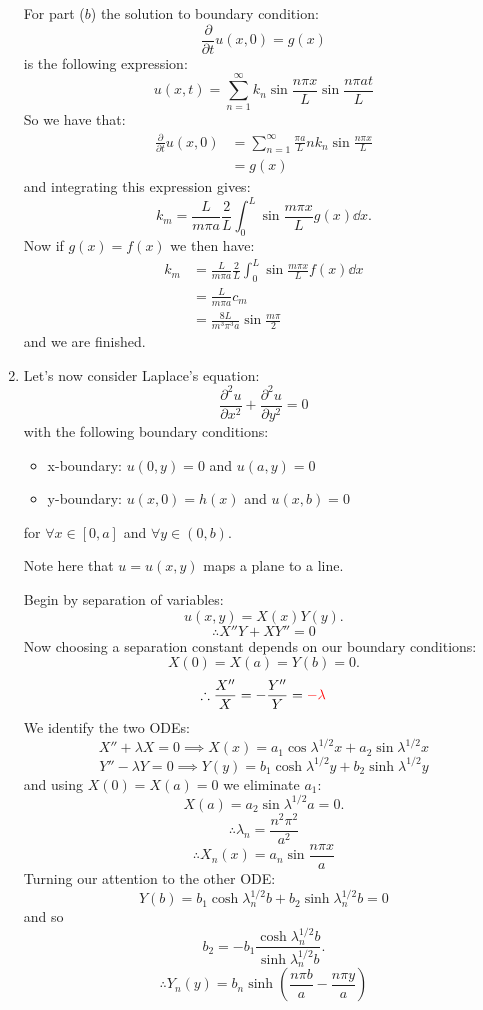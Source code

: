 \begin{enumerate}
    \newpage

    For part ($b$) the solution to boundary condition:
    $$\frac{\partial}{\partial t}u(x,0)=g(x)$$
    is the following expression:
    $$u(x,t)=\sum_{n=1}^{\infty}k_n
    \sin\frac{n\pi x}{L}\sin\frac{n\pi at}{L}$$
    So we have that:
    \begin{align*}
        \frac{\partial}{\partial t}u(x,0)
        &=\sum_{n=1}^{\infty}\frac{\pi a}{L}
        nk_n
        \sin\frac{n\pi x}{L} \\
        &=g(x)
    \end{align*}
    and integrating this expression gives:
    $$k_m=\frac{L}{m\pi a}
    \frac{2}{L}\int_{0}^{L}
    \sin\frac{m\pi x}{L}g(x)\dd x.$$
    Now if $g(x)=f(x)$ we then have:
    \begin{align*}
        k_m
        &=\frac{L}{m\pi a}
        \frac{2}{L}\int_{0}^{L}
        \sin\frac{m\pi x}{L}f(x)\dd x \\
        &=\frac{L}{m\pi a}c_m \\
        &=\frac{8L}{m^3\pi^3 a}\sin\frac{m\pi}{2}
    \end{align*}
    and we are finished.

    \newpage

    \item Let's now consider Laplace's equation:
    $$\frac{\partial^2 u}{\partial x^2}+\frac{\partial^2 u}{\partial y^2}=0$$
    with the following boundary conditions:
    \begin{itemize}
        \item x-boundary: $u(0,y)=0$ and $u(a,y)=0$
        \item y-boundary: $u(x,0)=h(x)$ and $u(x,b)=0$
    \end{itemize}
    for $\forall x\in[0,a]$ and $\forall y\in(0,b)$.

    Note here that $u=u(x,y)$ maps a plane to a line.

    Begin by separation of variables:
    $$u(x,y)=X(x)Y(y).$$
    $$\therefore X''Y+XY''=0$$
    Now choosing a separation constant depends on our boundary conditions:
    $$X(0)=X(a)=Y(b)=0.$$
    $$\therefore\frac{X''}{X}=-\frac{Y''}{Y}=\textcolor{red}{-\lambda}$$
    We identify the two ODEs:
    $$X''+\lambda X=0\implies
    X(x)=a_1\cos\lambda^{1/2} x+a_2\sin\lambda^{1/2} x$$
    $$Y''-\lambda Y=0\implies
    Y(y)=b_1\cosh\lambda^{1/2}y+b_2\sinh\lambda^{1/2}y$$
    and using $X(0)=X(a)=0$ we eliminate $a_1$:
    $$X(a)=a_2\sin\lambda^{1/2}a=0.$$
    $$\therefore\lambda_n=\frac{n^2\pi^2}{a^2}$$
    $$\therefore X_n(x)=a_n\sin\frac{n\pi x}{a}$$
    Turning our attention to the other ODE:
    $$Y(b)=b_1\cosh\lambda_n^{1/2}b+b_2\sinh\lambda_n^{1/2}b=0$$
    and so
    $$b_2=-b_1\frac{\cosh\lambda_n^{1/2}b}{\sinh\lambda_n^{1/2}b}.$$
    $$\therefore Y_n(y)
    =b_n\sinh\left(\frac{n\pi b}{a}
    -\frac{n\pi y}{a}\right)$$


\end{enumerate}
